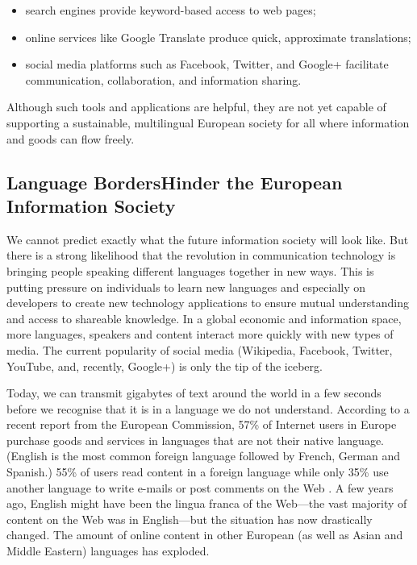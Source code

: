 \begin{multicols}{2}
\begin{itemize}
      \item search engines provide keyword-based access to web pages;
      \item online services like Google Translate produce quick, approximate translations;
      \item social media platforms such as Facebook, Twitter, and Google+ facilitate communication, collaboration, and information sharing.
    \end{itemize}
    Although such tools and applications are helpful, they are not yet capable of supporting a sustainable, multilingual European society for all where information and goods can flow freely.

\subsection[Language Borders Hinder the European Information Society]{Language Borders\newline Hinder the European Information Society}

    We cannot predict exactly what the future information society will look like. But there is a strong likelihood that the revolution in communication technology is bringing people speaking different languages together in new ways. This is putting pressure on individuals to learn new languages and especially on developers to create new technology applications to ensure mutual understanding and access to shareable knowledge. In a global economic and information space, more languages, speakers and content interact more quickly with new types of media. The current popularity of social media (Wikipedia, Facebook, Twitter, YouTube, and, recently, Google+) is only the tip of the iceberg.

   
    Today, we can transmit gigabytes of text around the world in a few seconds before we recognise that it is in a language we do not understand. According to a recent report from the European Commission, 57\% of Internet users in Europe purchase goods and services in languages that are not their native language. (English is the most common foreign language followed by French, German and Spanish.) 55\% of users read content in a foreign language while only 35\% use another language to write e-mails or post comments on the Web \cite{BAS-Nota1}. A few years ago, English might have been the lingua franca of the Web—the vast majority of content on the Web was in English—but the situation has now drastically changed. The amount of online content in other European (as well as Asian and Middle Eastern) languages has exploded.


\end{multicols}
